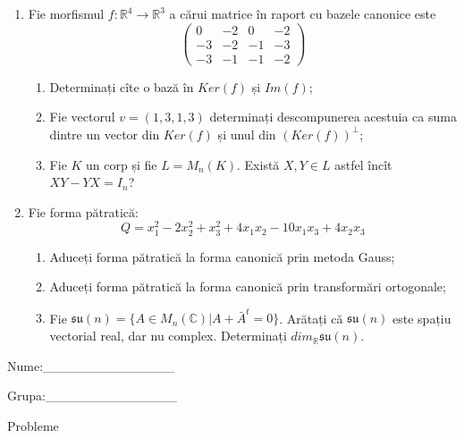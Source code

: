 \documentclass{article}
\begin{document}
\begin{enumerate}
 \item Fie morfismul $f:\mathbb{R}^4 \to \mathbb{R}^3$ a cărui matrice în raport cu bazele canonice este
$$\begin{pmatrix}
0&-2&0&-2\\
-3&-2&-1&-3\\
-3&-1&-1&-2
\end{pmatrix}$$

\begin{enumerate}
\item Determinați cîte o bază în $Ker(f)$ și $Im(f)$;
\item Fie vectorul $v=(1,3,1,3)$ determinați descompunerea acestuia ca suma dintre un vector din $Ker(f)$ și unul din $(Ker(f))^\perp$;
\item Fie $K$ un corp și fie $L=M_n(K)$. Există $X,Y \in L$ astfel încît $XY-YX=I_n$?  
\end{enumerate}
\item Fie forma pătratică:
$$Q= x_1^2-2x_2^2+x_3^2+4x_1x_2-10x_1x_3+4x_2x_3$$

\begin{enumerate}
\item Aduceți forma pătratică la forma canonică prin metoda Gauss;
\item Aduceți forma pătratică la forma canonică prin transformări ortogonale;
\item Fie $\mathfrak{su}(n)=\{ A \in M_n(\mathbb{C}) | A+\bar{A}^t=0\}$. Arătați că $\mathfrak{su}(n)$ este spațiu vectorial real, dar nu complex.
Determinați $dim_{\mathbb{R}}\mathfrak{su}(n)$.
\end{enumerate}
\end{enumerate}
\newpage
\begin{flushright}
Nume:\_\_\_\_\_\_\_\_\_\_\_\_\_\_
 
 
Grupa:\_\_\_\_\_\_\_\_\_\_\_\_\_\_
\end{flushright}
\begin{center}
\vspace{2cm}
{\Large Probleme}
\vspace{2cm}
\end{center}
\end{document}
